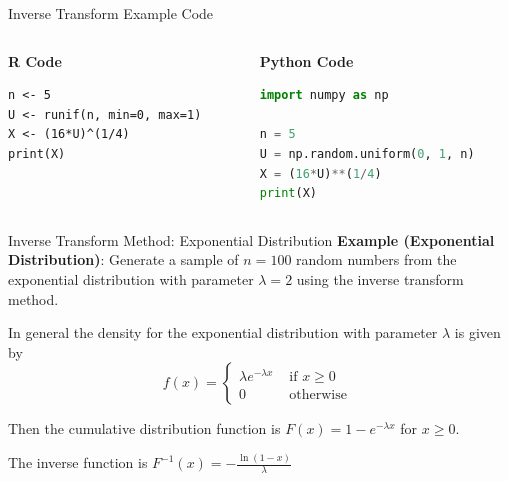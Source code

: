 \documentclass[8pt]{beamer}
\begin{document}
\begin{frame}[fragile]{Inverse Transform Example}
\alert{Code}

\vspace{2mm}

\begin{columns}[T]
\begin{column}{0.4\textwidth}
\textbf{\textbf{R Code}}
\begin{lstlisting}
n <- 5
U <- runif(n, min=0, max=1)
X <- (16*U)^(1/4)
print(X)
\end{lstlisting}
\end{column}

\begin{column}{0.45\textwidth}
\textbf{Python Code}
\begin{lstlisting}[language=Python]
import numpy as np

n = 5
U = np.random.uniform(0, 1, n)
X = (16*U)**(1/4)
print(X)
\end{lstlisting}
\end{column}
\end{columns}
\end{frame}

\begin{frame}[fragile]{Inverse Transform Method: Exponential Distribution}
\textbf{Example (Exponential Distribution)}: Generate a sample of $n=100$ random numbers from the exponential distribution with parameter $\lambda=2$ using the inverse transform method. 

\vspace{2mm}

\pause

In general the density for the exponential distribution with parameter $\lambda$ is given by
\begin{equation*}
f(x)=\left\{ 
\begin{array}{ll}
\lambda e^{-\lambda x} & \text{ if } x \geq 0  \\
0 & \text { otherwise }
\end{array}
\right.
\end{equation*}

Then the cumulative distribution function is $F(x)=1-e^{-\lambda x}$ for $x\geq 0$.

The inverse function is $\displaystyle{F^{-1}(x)=-\frac{\ln(1-x)}{\lambda}}$
\end{frame}
\end{document}
